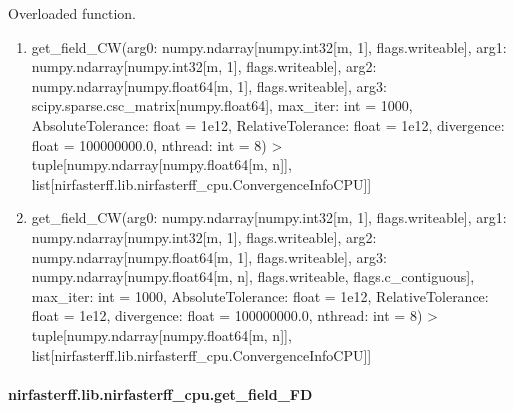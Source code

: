 \documentclass[letterpaper,10pt,english]{sphinxmanual}
\begin{document}
\begin{fulllineitems}
\label{\detokenize{_autosummary/nirfasterff.lib.nirfasterff_cpu.get_field_CW:nirfasterff.lib.nirfasterff_cpu.get_field_CW}}
\pysigstartsignatures
{}
\pysigstopsignatures
\sphinxAtStartPar
Overloaded function.
\begin{enumerate}
%
\item {} 
\sphinxAtStartPar
get\_field\_CW(arg0: numpy.ndarray{[}numpy.int32{[}m, 1{]}, flags.writeable{]}, arg1: numpy.ndarray{[}numpy.int32{[}m, 1{]}, flags.writeable{]}, arg2: numpy.ndarray{[}numpy.float64{[}m, 1{]}, flags.writeable{]}, arg3: scipy.sparse.csc\_matrix{[}numpy.float64{]}, max\_iter: int = 1000, AbsoluteTolerance: float = 1e\sphinxhyphen{}12, RelativeTolerance: float = 1e\sphinxhyphen{}12, divergence: float = 100000000.0, nthread: int = 8) \sphinxhyphen{}\textgreater{} tuple{[}numpy.ndarray{[}numpy.float64{[}m, n{]}{]}, list{[}nirfasterff.lib.nirfasterff\_cpu.ConvergenceInfoCPU{]}{]}

\item {} 
\sphinxAtStartPar
get\_field\_CW(arg0: numpy.ndarray{[}numpy.int32{[}m, 1{]}, flags.writeable{]}, arg1: numpy.ndarray{[}numpy.int32{[}m, 1{]}, flags.writeable{]}, arg2: numpy.ndarray{[}numpy.float64{[}m, 1{]}, flags.writeable{]}, arg3: numpy.ndarray{[}numpy.float64{[}m, n{]}, flags.writeable, flags.c\_contiguous{]}, max\_iter: int = 1000, AbsoluteTolerance: float = 1e\sphinxhyphen{}12, RelativeTolerance: float = 1e\sphinxhyphen{}12, divergence: float = 100000000.0, nthread: int = 8) \sphinxhyphen{}\textgreater{} tuple{[}numpy.ndarray{[}numpy.float64{[}m, n{]}{]}, list{[}nirfasterff.lib.nirfasterff\_cpu.ConvergenceInfoCPU{]}{]}

\end{enumerate}

\end{fulllineitems}


\sphinxstepscope


\paragraph{nirfasterff.lib.nirfasterff\_cpu.get\_field\_FD}
\label{\detokenize{_autosummary/nirfasterff.lib.nirfasterff_cpu.get_field_FD:nirfasterff-lib-nirfasterff-cpu-get-field-fd}}\label{\detokenize{_autosummary/nirfasterff.lib.nirfasterff_cpu.get_field_FD::doc}}
\end{document}
